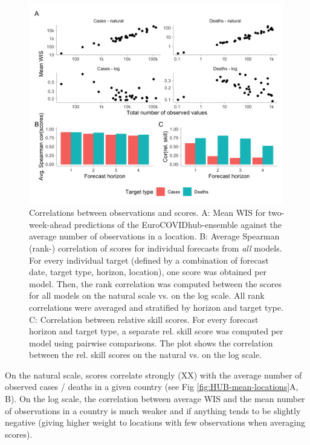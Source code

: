 \documentclass{article}
\begin{document}
\begin{figure}[h!]
    \centering
    \includegraphics[width=0.99\textwidth]{output/figures/HUB-correlations.png}
    \caption{Correlations between observations and scores. A: Mean WIS for two-week-ahead predictions of the EuroCOVIDhub-ensemble against the average number of observations in a location. B: Average Spearman (rank-) correlation of scores for individual forecasts from \textit{all} models. For every individual target (defined by a combination of forecast date, target type, horizon, location), one score was obtained per model. Then, the rank correlation was computed between the scores for all models on the natural scale vs. on the log scale. All rank correlations were averaged and stratified by horizon and target type. C: Correlation between relative skill scores. For every forecast horizon and target type, a separate rel. skill score was computed per model using pairwise comparisons. The plot shows the correlation between the rel. skill scores on the natural vs. on the log scale.}
    \label{fig:HUB-cors}
\end{figure}

On the natural scale, scores correlate strongly (XX) with the average number of observed cases / deaths in a given country (see Fig \ref{fig:HUB-mean-locations}A, B). On the log scale, the correlation between average WIS and the mean number of observations in a country is much weaker and if anything tends to be slightly negative (giving higher weight to locations with few observations when averaging scores). 
\end{document}
